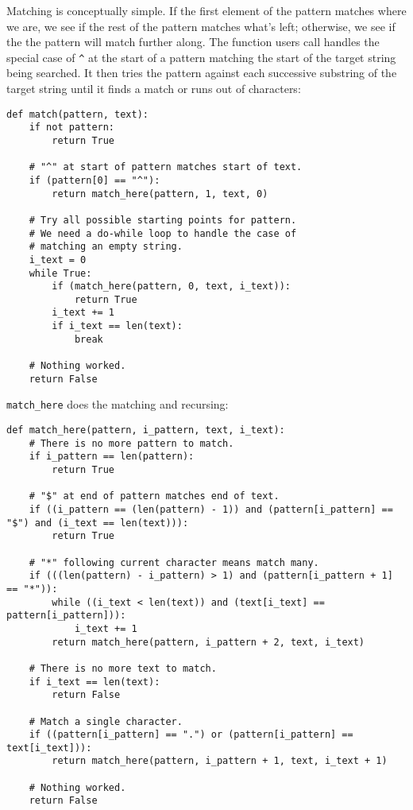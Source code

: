 \documentclass{scrbook}
\begin{document}
Matching is conceptually simple.
If the first element of the pattern matches where we are,
we see if the rest of the pattern matches what's left;
otherwise,
we see if the the pattern will match further along.
The function users call handles the special case of \texttt{{\textasciicircum}} at the start of a pattern
matching the start of the target string being searched.
It then tries the pattern against each successive substring of the target string
until it finds a match or runs out of characters:


\begin{lstlisting}[frame=single,frameround=tttt]
def match(pattern, text):
    if not pattern:
        return True

    # "^" at start of pattern matches start of text.
    if (pattern[0] == "^"):
        return match_here(pattern, 1, text, 0)

    # Try all possible starting points for pattern.
    # We need a do-while loop to handle the case of
    # matching an empty string.
    i_text = 0
    while True:
        if (match_here(pattern, 0, text, i_text)):
            return True
        i_text += 1
        if i_text == len(text):
            break

    # Nothing worked.
    return False
\end{lstlisting}



\texttt{match\_here} does the matching and recursing:


\begin{lstlisting}[frame=single,frameround=tttt]
def match_here(pattern, i_pattern, text, i_text):
    # There is no more pattern to match.
    if i_pattern == len(pattern):
        return True

    # "$" at end of pattern matches end of text.
    if ((i_pattern == (len(pattern) - 1)) and (pattern[i_pattern] == "$") and (i_text == len(text))):
        return True

    # "*" following current character means match many.
    if (((len(pattern) - i_pattern) > 1) and (pattern[i_pattern + 1] == "*")):
        while ((i_text < len(text)) and (text[i_text] == pattern[i_pattern])):
            i_text += 1
        return match_here(pattern, i_pattern + 2, text, i_text)

    # There is no more text to match.
    if i_text == len(text):
        return False

    # Match a single character.
    if ((pattern[i_pattern] == ".") or (pattern[i_pattern] == text[i_text])):
        return match_here(pattern, i_pattern + 1, text, i_text + 1)

    # Nothing worked.
    return False
\end{lstlisting}
\end{document}
